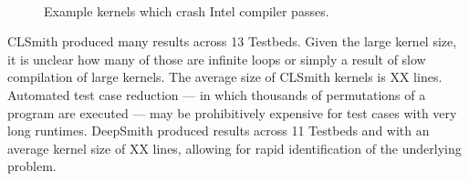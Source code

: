 \begin{figure}
  \centering
  \\%
  \\%
  \\%
  \\%
  \\%
  \\%
  \caption{Example kernels which crash Intel compiler passes.}%
  \label{lst:intel-passes}
\end{figure}



CLSmith produced many \bto results across 13 Testbeds. Given the large kernel size, it is unclear how many of those are infinite loops or simply a result of slow compilation of large kernels. The average size of CLSmith \bto kernels is XX lines. Automated test case reduction --- in which thousands of permutations of a program are executed --- may be prohibitively expensive for test cases with very long runtimes. DeepSmith produced \bto results across 11 Testbeds and with an average kernel size of XX lines, allowing for rapid identification of the underlying problem.


